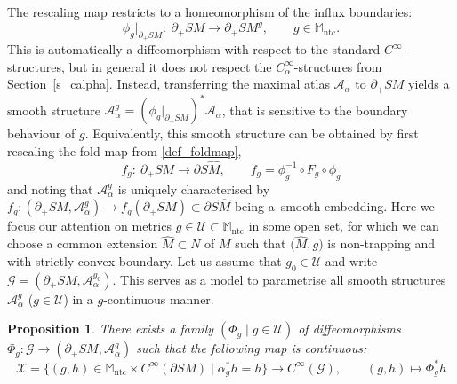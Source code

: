 \documentclass[10pt,a4paper]{amsart}
\numberwithin{equation}{section}
\newtheorem{Proposition}[Theorem]{Proposition}
\theoremstyle{definition}
\newcommand{\M}{\mathbb{M}}
\newcommand{\1}{{\bf 1}}
\newcommand{\ntc}{\mathrm{ntc}}
\begin{document}
The rescaling map restricts to a homeomorphism of the influx boundaries:
\[
		\phi_g|_{\partial_+SM}\colon\ \partial_+{SM} \to \partial_+SM^g,\qquad g\in \M_\ntc.
\]
This is automatically a diffeomorphism with respect to the standard $C^\infty$-structures, but in general it does not respect the $C_\alpha^\infty$-structures from Section~\ref{s_calpha}. Instead, transferring the maximal atlas $\mathcal A_\alpha$ to $\partial_+SM$ yields a smooth structure
$\mathcal A_{\alpha}^g = (\phi_g|_{\partial_+SM})^*\mathcal A_\alpha$,
that is sensitive to the boundary behaviour of $g$. Equivalently, this smooth structure can be obtained by first rescaling the fold map from \eqref{def_foldmap},
\[
	f_g\colon\ \partial_+SM \to \partial S\hat M,\qquad f_g = \phi_g^{-1}\circ F_g\circ \phi_g
\]
and noting that $\mathcal A_\alpha^g$ is uniquely characterised by $f_g\colon (\partial_+SM,\mathcal A_\alpha^g)\to f_g(\partial_+SM)\subset\partial S\hat M$ being a~smooth embedding. Here we focus our attention on metrics $g\in \mathcal U\subset \M_\ntc$ in some open set, for which we can choose a common extension $\hat M\subset N$ of $M$ such that $\bigl(\hat M,g\bigr)$ is non-trapping and with strictly convex boundary. Let us assume that $g_0\in \mathcal U$ and write
$\mathcal G = (\partial_+SM,\mathcal A_\alpha^{g_0})$.
This serves as a model to parametrise all smooth structures $\mathcal A_\alpha^g$ ($g\in \mathcal U$) in a $g$-continuous manner.

\begin{Proposition}\label{prop_refG}
	There exists a family $(\Phi_g\mid g\in \mathcal U)$ of diffeomorphisms $\Phi_g\colon \mathcal G\to (\partial_+SM,\mathcal A_\alpha^g)$ such that the following map is continuous:
	\[
		\mathcal X =\{(g,h)\in \M_\ntc\times C^\infty(\partial SM)\mid \alpha_g^*h=h\} \to C^\infty(\mathcal G),\qquad (g,h)\mapsto \Phi_g^* h
	\]
\end{Proposition}
\end{document}
